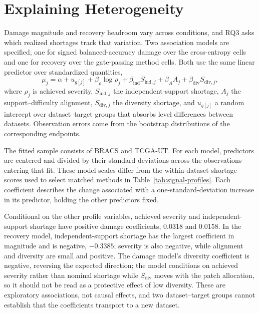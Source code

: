 \documentclass[11pt]{article}
\newcommand{\resultstable}[1]{}
\begin{document}
\section{Explaining Heterogeneity}
\label{sec:rq3}
Damage magnitude and recovery headroom vary across conditions, and RQ3 asks which realized shortages track that variation. Two association models are specified, one for signed balanced-accuracy damage over the cross-entropy cells and one for recovery over the gate-passing method cells. Both use the same linear predictor over standardized quantities,
\begin{equation}
  \mu_j = \alpha + u_{g[j]} + \beta_{\rho}\log \rho_j + \beta_{\mathrm{ind}} S_{\mathrm{ind},j} + \beta_{A} A_j + \beta_{\mathrm{div}} S_{\mathrm{div},j},
  \label{eq:rq3-model}
\end{equation}
\noindent where $\rho_j$ is achieved severity, $S_{\mathrm{ind},j}$ the independent-support shortage, $A_j$ the support--difficulty alignment, $S_{\mathrm{div},j}$ the diversity shortage, and $u_{g[j]}$ a random intercept over dataset--target groups that absorbs level differences between datasets. Observation errors come from the bootstrap distributions of the corresponding endpoints.

The fitted sample consists of BRACS and TCGA-UT. For each model, predictors are centered and divided by their standard deviations across the observations entering that fit. These model scales differ from the within-dataset shortage scores used to select matched methods in Table~\ref{tab:signal-profiles}. Each coefficient describes the change associated with a one-standard-deviation increase in its predictor, holding the other predictors fixed.

\begin{table}[ht]
  \centering
  \scriptsize
  \resultstable{rq3_models}
  \caption{Maximum a posteriori estimates for the two exploratory association models fitted to BRACS and TCGA-UT. Damage is signed balanced-accuracy loss and recovery is the recovered fraction. Predictors are standardized within each model's fitted sample.}
  \label{tab:rq3-models}
\end{table}

\noindent Conditional on the other profile variables, achieved severity and independent-support shortage have positive damage coefficients, \num{0.0318} and \num{0.0158}. In the recovery model, independent-support shortage has the largest coefficient in magnitude and is negative, $-\num{0.3385}$; severity is also negative, while alignment and diversity are small and positive. The damage model's diversity coefficient is negative, reversing the expected direction; the model conditions on achieved severity rather than nominal shortage while $S_{\mathrm{div}}$ moves with the patch allocation, so it should not be read as a protective effect of low diversity. These are exploratory associations, not causal effects, and two dataset--target groups cannot establish that the coefficients transport to a new dataset.
\end{document}

